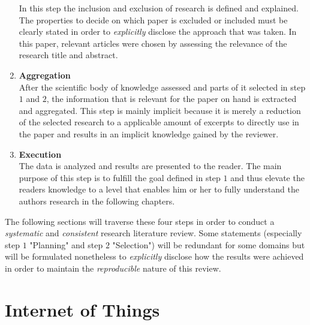 \begin{enumerate}
    In this step the inclusion and exclusion of research is defined and explained. The properties to decide on which paper is excluded or included must be clearly stated in order to \textit{explicitly} disclose the approach that was taken. In this paper, relevant articles were chosen by assessing the relevance of the research title and abstract. 
    \item
    \textbf{Aggregation}\\
    After the scientific body of knowledge assessed and parts of it selected in step $1$ and $2$, the information that is relevant for the paper on hand is extracted and aggregated. This step is mainly implicit because it is merely a reduction of the selected research to a applicable amount of excerpts to directly use in the paper and results in an implicit knowledge gained by the reviewer.
    \item
    \textbf{Execution}\\
    The data is analyzed and results are presented to the reader. The main purpose of this step is to fulfill the goal defined in step $1$ and thus elevate the readers knowledge to a level that enables him or her to fully understand the authors research in the following chapters.
\end{enumerate}

The following sections will traverse these four steps in order to conduct a \textit{systematic} and \textit{consistent} research literature review. Some statements (especially step $1$ "Planning" and step $2$ "Selection") will be redundant for some domains but will be formulated nonetheless to \textit{explicitly} disclose how the results were achieved in order to maintain the \textit{reproducible} nature of this review.


\section{Internet of Things}

